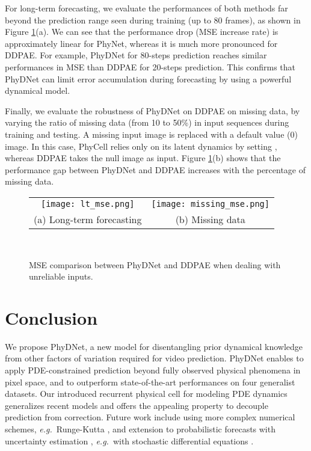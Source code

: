\documentclass[10pt,twocolumn,letterpaper]{article}
\def\eg{\textit{e.g.}~}
\begin{document}
For long-term forecasting, we evaluate the performances of both methods far beyond the prediction range seen during training (up to 80 frames), as shown in Figure \ref{fig:long-term}(a). We can see that the performance drop (MSE increase rate) is approximately linear for PhyNet, whereas it is much more pronounced for DDPAE. For example, PhyDNet for 80-steps prediction reaches similar performances in MSE than DDPAE for 20-steps prediction. This confirms that PhyDNet can limit error accumulation during forecasting by using a powerful dynamical model.




Finally, we evaluate the robustness of PhyDNet on DDPAE on missing data, by varying the ratio of missing data (from 10 to 50\%) in input sequences during training and testing. A missing input image is replaced with a default value (0) image. In this case, PhyCell relies only on its latent dynamics by setting , whereas DDPAE takes the null image as input. Figure \ref{fig:long-term}(b) shows that the performance gap between PhyDNet and DDPAE increases with the percentage of missing data. 

\vspace{-0.2cm}
\begin{figure}[H]
    \centering
    \begin{tabular}{cc}
    \hspace{-0.8cm} \texttt{[image: lt\_mse.png]}     &  \hspace{-0.5cm} \texttt{[image: missing\_mse.png]} \\
        (a) Long-term forecasting & (b) Missing data 
    \end{tabular} \\

    \caption{MSE comparison between PhyDNet and DDPAE \cite{hsieh2018learning} when dealing with unreliable inputs.}
    \label{fig:long-term}
\end{figure}







\section{Conclusion}

We propose PhyDNet, a new model for disentangling prior dynamical knowledge from other factors of variation required for video prediction. PhyDNet enables to apply PDE-constrained prediction beyond fully observed physical phenomena in pixel space, and to outperform state-of-the-art performances on four generalist datasets. Our introduced recurrent physical cell for modeling PDE dynamics generalizes recent models and offers the appealing property to decouple prediction from correction. Future work include using more complex numerical schemes, \eg Runge-Kutta \cite{fablet2018bilinear}, and extension to probabilistic forecasts with uncertainty estimation \cite{gal2016dropout,corbiere19}, \eg with stochastic differential equations \cite{jia2019neural}.


{\small


}
\end{document}

